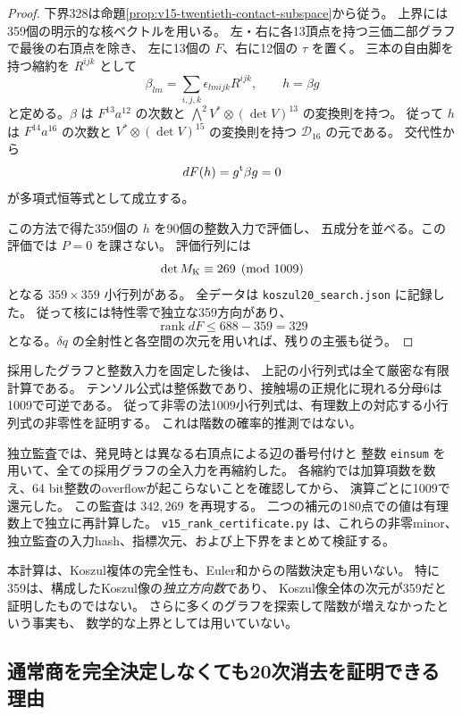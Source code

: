\begin{proof}
下界328は命題\ref{prop:v15-twentieth-contact-subspace}から従う。
上界には359個の明示的な核ベクトルを用いる。
左・右に各13頂点を持つ三価二部グラフで最後の右頂点を除き、
左に13個の $F$、右に12個の $\tau$ を置く。
三本の自由脚を持つ縮約を $R^{ijk}$ として
\[
       \beta_{lm}=\sum_{i,j,k}\epsilon_{lmijk}R^{ijk},
       \qquad h=\beta g
\]
と定める。$\beta$ は $F^{13}a^{12}$ の次数と
$\bigwedge^2V^*\otimes(\det V)^{13}$ の変換則を持つ。
従って $h$ は $F^{14}a^{16}$ の次数と
$V^*\otimes(\det V)^{15}$ の変換則を持つ $\mathcal D_{16}$ の元である。
交代性から
\[
                      dF(h)=g^{\rm t}\beta g=0
\]
が多項式恒等式として成立する。

この方法で得た359個の $h$ を90個の整数入力で評価し、
五成分を並べる。この評価では $P=0$ を課さない。
評価行列には
\[
                   \det M_{\rm K}\equiv269\pmod{1009}
\]
となる $359\times359$ 小行列がある。
全データは \texttt{koszul20\_search.json} に記録した。
従って核には特性零で独立な359方向があり、
\[
                        \operatorname{rank}dF\le688-359=329
\]
となる。$\delta q$ の全射性と各空間の次元を用いれば、残りの主張も従う。
\end{proof}

\begin{remark}[非零minorの意味と再現可能性]
\label{rem:v15-twentieth-rank-certificate-scope}
採用したグラフと整数入力を固定した後は、
上記の小行列式は全て厳密な有限計算である。
テンソル公式は整係数であり、接触場の正規化に現れる分母6は1009で可逆である。
従って非零の法1009小行列式は、有理数上の対応する小行列式の非零性を証明する。
これは階数の確率的推測ではない。

独立監査では、発見時とは異なる右頂点による辺の番号付けと
整数 \texttt{einsum} を用いて、全ての採用グラフの全入力を再縮約した。
各縮約では加算項数を数え、64 bit整数のoverflowが起こらないことを確認してから、
演算ごとに1009で還元した。
この監査は $342,269$ を再現する。
二つの補元の180点での値は有理数上で独立に再計算した。
\nolinkurl{v15_rank_certificate.py} は、これらの非零minor、
独立監査の入力hash、指標次元、および上下界をまとめて検証する。

本計算は、Koszul複体の完全性も、Euler和からの階数決定も用いない。
特に359は、構成したKoszul像の\emph{独立方向数}であり、
Koszul像全体の次元が359だと証明したものではない。
さらに多くのグラフを探索して階数が増えなかったという事実も、
数学的な上界としては用いていない。
\end{remark}

\subsection{通常商を完全決定しなくても20次消去を証明できる理由}
\label{subsec:v15-certified-subspace-suffices}

